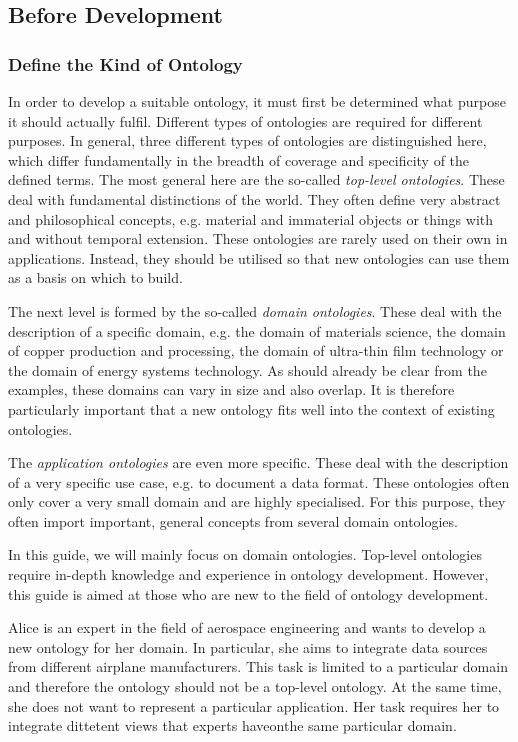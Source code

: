 \subsection{Before Development}

\subsubsection{Define the Kind of Ontology}
\label{sssec:ontologykind}

In order to develop a suitable ontology, it must first be determined what purpose it should actually fulfil. Different types of ontologies are required for different purposes. In general, three different types of ontologies are distinguished here, which differ fundamentally in the breadth of coverage and specificity of the defined terms.
The most general here are the so-called \textit{top-level ontologies}. These deal with fundamental distinctions of the world. They often define very abstract and philosophical concepts, e.g. material and immaterial objects or things with and without temporal extension. These ontologies are rarely used on their own in applications. Instead, they should be utilised so that new ontologies can use them as a basis on which to build.

The next level is formed by the so-called \textit{domain ontologies}. These deal with the description of a specific domain, e.g. the domain of materials science, the domain of copper production and processing, the domain of ultra-thin film technology or the domain of energy systems technology. As should already be clear from the examples, these domains can vary in size and also overlap. It is therefore particularly important that a new ontology fits well into the context of existing ontologies.

The \textit{application ontologies} are even more specific. These deal with the description of a very specific use case, e.g. to document a data format. These ontologies often only cover a very small domain and are highly specialised. For this purpose, they often import important, general concepts from several domain ontologies.

In this guide, we will mainly focus on domain ontologies. Top-level ontologies require in-depth knowledge and experience in ontology development. However, this guide is aimed at those who are new to the field of ontology development.


\begin{example}
Alice is an expert in the field of aerospace engineering and wants to develop a new ontology for her domain. In particular, she aims to integrate data sources from different airplane manufacturers. This task is limited to a particular domain and therefore the ontology should not be a top-level ontology. At the same time, she does not want to represent a particular application. Her task requires her to integrate dittetent views that experts haveonthe same particular domain.


\end{example}

